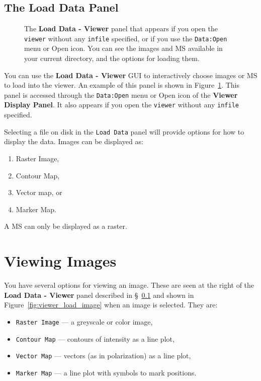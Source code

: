 
\subsection{The Load Data Panel}
\label{section:display.viewerGUI.load}

\begin{figure}[h!]
\caption{\label{fig:viewer_load} The {\bf Load Data - Viewer} panel
that appears if you open the {\tt viewer} without any {\tt infile}
specified, or if you use the {\tt Data:Open} menu or Open icon.
You can see the images and MS available in your current directory,
and the options for loading them.} 
\hrulefill
\end{figure}

You can use the {\bf Load Data - Viewer} GUI to interactively
choose images or MS to load into the viewer.  An example of
this panel is shown in Figure~\ref{fig:viewer_load}.  This
panel is accessed through the {\tt Data:Open} menu or Open icon
of the {\bf Viewer Display Panel}.  It also appears if you open 
the {\tt viewer} without any {\tt infile} specified.

Selecting a file on disk in the {\tt Load Data} panel will
provide options for how to display the data. Images can be displayed
as: 
\begin{enumerate}
\item Raster Image, 
\item Contour Map, 
\item Vector map, or 
\item Marker Map.  
\end{enumerate}
A MS can only be displayed as a raster.

\section{Viewing Images}
\label{section:display.image}

You have several options for viewing an image.  These are seen
at the right of the {\bf Load Data - Viewer} panel 
described in \S~\ref{section:display.viewerGUI.load} and shown in 
Figure~\ref{fig:viewer_load_image} when an image is selected.  They are:
\begin{itemize}
   \item {\tt Raster Image} --- a greyscale or color image,
   \item {\tt Contour Map} --- contours of intensity as a line plot,
   \item {\tt Vector Map} --- vectors (as in polarization) as a line plot,
   \item {\tt Marker Map} --- a line plot with symbols to mark positions.
\end{itemize}

